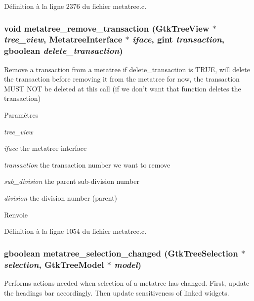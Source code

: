 Définition à la ligne 2376 du fichier metatree.c.

\subsubsection[{metatree\_\-remove\_\-transaction}]{\setlength{\rightskip}{0pt plus 5cm}void metatree\_\-remove\_\-transaction (GtkTreeView $\ast$ {\em tree\_\-view}, \/  {\bf MetatreeInterface} $\ast$ {\em iface}, \/  gint {\em transaction}, \/  gboolean {\em delete\_\-transaction})}\label{metatree_8c_a65e380c4327a404b4d9686292e8e8e6e}
Remove a transaction from a metatree if delete\_\-transaction is TRUE, will delete the transaction before removing it from the metatree for now, the transaction MUST NOT be deleted at this call (if we don't want that function deletes the transaction)


\begin{DoxyParams}{Paramètres}
\item[{\em tree\_\-view}]\item[{\em iface}]the metatree interface \item[{\em transaction}]the transaction number we want to remove \item[{\em sub\_\-division}]the parent sub-\/division number \item[{\em division}]the division number (parent)\end{DoxyParams}
\begin{DoxyReturn}{Renvoie}

\end{DoxyReturn}


Définition à la ligne 1054 du fichier metatree.c.

\subsubsection[{metatree\_\-selection\_\-changed}]{\setlength{\rightskip}{0pt plus 5cm}gboolean metatree\_\-selection\_\-changed (GtkTreeSelection $\ast$ {\em selection}, \/  GtkTreeModel $\ast$ {\em model})}\label{metatree_8c_af2fb2eaf7cbecb065aa16959047b9f6d}
Performs actions needed when selection of a metatree has changed. First, update the headings bar accordingly. Then update sensitiveness of linked widgets.

